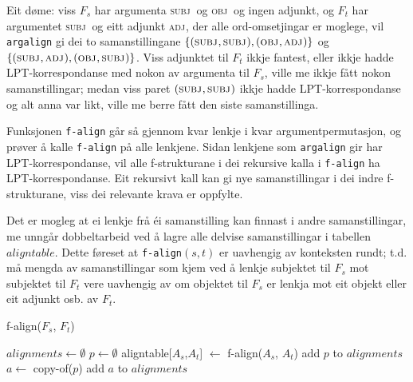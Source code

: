 \documentclass[11pt,a4paper,oneside,draft]{book}
\newcommand{\F}[2]{\textsc{#1}\ensuremath{_{#2}}}
\newcommand{\OBJ}{\F{obj}{}}
\newcommand{\OBJs}{\F{obj~}{}}
\newcommand{\ADJ}{\F{adj}{}}
\newcommand{\SUBJ}{\F{subj}{}}
\newcommand{\SUBJs}{\F{subj~}{}}
\begin{document}
Eit døme: viss $F_s$ har argumenta \SUBJs og \OBJs og ingen adjunkt,
og $F_t$ har argumentet \SUBJs og eitt adjunkt \ADJ, der alle
ord-omsetjingar er moglege, vil \texttt{argalign} gi dei to samanstillingane
$\{(\SUBJ,\SUBJ), (\OBJ,\ADJ)\}$ og $\{(\SUBJ,\ADJ),
(\OBJ,\SUBJ)\}$. Viss adjunktet til $F_t$ ikkje fantest, eller ikkje
hadde LPT-korrespondanse med nokon av argumenta til $F_s$, ville me
ikkje fått nokon samanstillingar; medan viss paret $(\SUBJ,\SUBJ)$
ikkje hadde LPT-korrespondanse og alt anna var likt, ville me berre
fått den siste samanstillinga.

Funksjonen \texttt{f-align} går så gjennom kvar lenkje i kvar
argumentpermutasjon, og prøver å kalle \texttt{f-align} på alle
lenkjene. Sidan lenkjene som \texttt{argalign} gir har LPT-korrespondanse,
vil alle f-strukturane i dei rekursive kalla i \texttt{f-align} ha
LPT-korrespondanse. Eit rekursivt kall kan gi nye samanstillingar i
dei indre f-strukturane, viss dei relevante krava er oppfylte.

Det er mogleg at ei lenkje frå éi samanstilling kan finnast i andre
samanstillingar, me unngår dobbeltarbeid ved å lagre alle delvise
samanstillingar i tabellen $aligntable$. Dette føreset at
\texttt{f-align}$(s,t)$ er uavhengig av konteksten rundt; t.d. må
mengda av samanstillingar som kjem ved å lenkje subjektet til $F_s$
mot subjektet til $F_t$ vere uavhengig av om objektet til $F_s$ er
lenkja mot eit objekt eller eit adjunkt osb. av $F_t$. 

  
     \begin{algorithm}[]
      \caption{f-align($F_s$, $F_t$)}
      \label{algo:f-align}
      
      $alignments \gets \emptyset$  \;
       {
        $p \gets \emptyset$ \;
          {
            {
           aligntable[$A_s$,$A_t$] $\gets$ f-align($A_s$, $A_t$)\;
           }
        }
        add $p$ to $alignments$ \;
         {
          $a \gets$ copy-of($p$) 
          add $a$ to $alignments$ \;
        } %
       } %
       \end{algorithm}    
    
\end{document}
